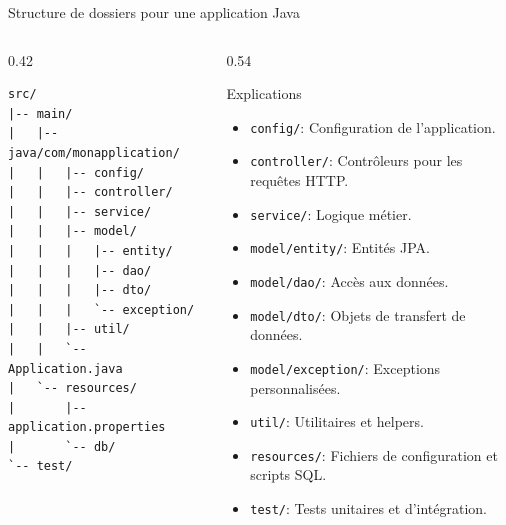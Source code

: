 \documentclass[aspectratio=169,10pt]{beamer}
\begin{document}
\begin{frame}[fragile]{Structure de dossiers pour une application Java}
  \begin{columns}[T]
    \begin{column}{0.42\textwidth}
\begin{lstlisting}[language={},basicstyle=\lstcode\scriptsize]
src/
|-- main/
|   |-- java/com/monapplication/
|   |   |-- config/
|   |   |-- controller/
|   |   |-- service/
|   |   |-- model/
|   |   |   |-- entity/
|   |   |   |-- dao/
|   |   |   |-- dto/
|   |   |   `-- exception/
|   |   |-- util/
|   |   `-- Application.java
|   `-- resources/
|       |-- application.properties
|       `-- db/
`-- test/
\end{lstlisting}
    \end{column}
    \begin{column}{0.54\textwidth}
      \begin{exampleblock}{Explications}
        \scriptsize
\begin{itemize}
                    \item \texttt{config/}: Configuration de l'application.
                    \item \texttt{controller/}: Contrôleurs pour les requêtes HTTP.
                    \item \texttt{service/}: Logique métier.
                    \item \texttt{model/entity/}: Entités JPA.
                    \item \texttt{model/dao/}: Accès aux données.
                    \item \texttt{model/dto/}: Objets de transfert de données.
                    \item \texttt{model/exception/}: Exceptions personnalisées.
                    \item \texttt{util/}: Utilitaires et helpers.
                    \item \texttt{resources/}: Fichiers de configuration et scripts SQL.
                    \item \texttt{test/}: Tests unitaires et d'intégration.
                \end{itemize}
      \end{exampleblock}
    \end{column}
  \end{columns}
\end{frame}
\end{document}
